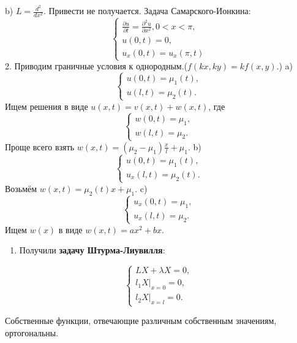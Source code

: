 \documentclass[11pt]{article}
\newcounter{th}\setcounter{th}{0}
\def\th{\par\smallskip\refstepcounter{th}\textbf{\arabic{th}}}
\newtheorem*{Theorem}{Теорема \th}
\begin{document}
b) \(L = \frac{d^2}{dx^2}\). Привести не получается.
Задача Самарского-Ионкина:
\begin{equation}
\begin{cases}
\frac{\partial u}{\partial t} = \frac{\partial^2u}{\partial x^2}, 0 < x < \pi, \\
u(0, t) = 0, \\
u_x(0, t) = u_x(\pi, t)
\end{cases}
\end{equation}
2. Приводим граничные условия к однородным.($f(kx, ky) = kf(x, y)$.)
a) \begin{equation}
\begin{cases}
u(0, t) = \mu_1(t), \\
u(l, t) = \mu_2(t).
\end{cases}
\end{equation}
Ищем решения в виде $u(x, t) = v(x, t) + w(x, t)$, где
\begin{equation}
\begin{cases}
w(0, t) = \mu_1, \\
w(l, t) = \mu_2.
\end{cases}
\end{equation}
Проще всего взять $w(x, t) = (\mu_2 - \mu_1)\frac{x}l + \mu_1$.
b) \begin{equation}
\begin{cases}
u(0, t) = \mu_1(t), \\
u_x(l, t) = \mu_2(t).
\end{cases}
\end{equation}
Возьмём $w(x, t) = \mu_2(t)x +\mu_1$.
c) \begin{equation}
\begin{cases}
u_x(0, t) = \mu_1, \\
u_x(l, t) = \mu_2.
\end{cases}
\end{equation}
Ищем $w(x)$ в виде $w(x, t) = ax^2 + bx$.
\begin{enumerate}
\item Получили \textbf{задачу Штурма-Лиувилля}:
\end{enumerate}
\begin{equation}
\begin{cases}
LX + \lambda X = 0, \\
l_1X|_{x = 0} = 0, \\
l_2X|_{x = l} = 0.
\end{cases}
\end{equation}
\begin{Theorem}
Собственные функции, отвечающие различным собственным значениям, ортогональны.
\end{Theorem}
\end{document}
